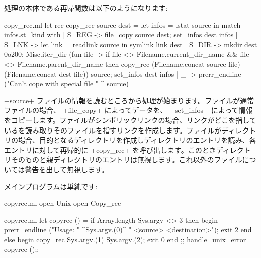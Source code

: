 処理の本体である再帰関数は以下のようになります:
\begin{listingcodefile}{copy_rec.ml}
let rec copy_rec source dest =
  let infos = lstat source in
  match infos.st_kind with
  | S_REG ->
      file_copy source dest;
      set_infos dest infos
  | S_LNK ->
      let link = readlink source in
      symlink link dest
  | S_DIR ->
      mkdir dest 0o200;
      Misc.iter_dir
        (fun file ->
          if file <> Filename.current_dir_name
              && file <> Filename.parent_dir_name
          then
            copy_rec
              (Filename.concat source file)
              (Filename.concat dest file))
        source;
      set_infos dest infos
  | _ ->
      prerr_endline ("Can't cope with special file " ^ source)
\end{listingcodefile}
%
\ml+source+ ファイルの情報を読むところから処理が始まります。ファイルが通常ファイルの場合、 \ml+file_copy+ によってデータを、 \ml+set_infos+ によって情報をコピーします。ファイルがシンボリックリンクの場合、リンクがどこを指しているを読み取りそのファイルを指すリンクを作成します。ファイルがディレクトリの場合、目的となるディレクトリを作成しディレクトリのエントリを読み、各エントリに対して再帰的に \ml+copy\_rec+ を呼び出します。このときディレクトリそのものと親ディレクトリのエントリは無視します。これ以外のファイルについては警告を出して無視します。

メインプログラムは単純です:
%
\begin{codefile}{copyrec.ml}
open Unix
open Copy_rec
\end{codefile}
%
\begin{listingcodefile}{copyrec.ml}
let copyrec () =
  if Array.length Sys.argv <> 3 then begin
    prerr_endline ("Usage: " ^Sys.argv.(0)^ " <source> <destination>");
    exit 2
  end else begin
    copy_rec Sys.argv.(1) Sys.argv.(2);
    exit 0
  end
;;
handle_unix_error copyrec ();;
\end{listingcodefile}


